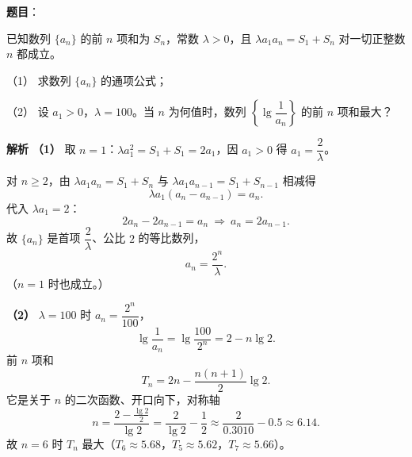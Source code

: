 \begin{answer}

\textbf{题目}：

已知数列 $\{a_n\}$ 的前 $n$ 项和为 $S_n$，常数 $\lambda>0$，且 $\lambda a_1a_n=S_1+S_n$ 对一切正整数 $n$ 都成立。

（1） 求数列 $\{a_n\}$ 的通项公式；

（2） 设 $a_1>0$，$\lambda=100$。当 $n$ 为何值时，数列 $\left\{\lg\dfrac1{a_n}\right\}$ 的前 $n$ 项和最大？

\textbf{解析}
\textbf{（1）} 取 $n=1$：$\lambda a_1^2=S_1+S_1=2a_1$，因 $a_1>0$ 得 $a_1=\dfrac2\lambda$。

对 $n\geqslant2$，由 $\lambda a_1a_n=S_1+S_n$ 与 $\lambda a_1a_{n-1}=S_1+S_{n-1}$ 相减得
\nopagebreak[4]
\[\lambda a_1\left(a_n-a_{n-1}\right)=a_n.\]
代入 $\lambda a_1=2$：
\nopagebreak[4]
\[2a_n-2a_{n-1}=a_n\ \Rightarrow\ a_n=2a_{n-1}.\]
故 $\{a_n\}$ 是首项 $\dfrac2\lambda$、公比 $2$ 的等比数列，
\nopagebreak[4]
\[a_n=\frac{2^n}{\lambda}.\]
（$n=1$ 时也成立。）

\textbf{（2）} $\lambda=100$ 时 $a_n=\dfrac{2^n}{100}$，
\nopagebreak[4]
\[\lg\frac1{a_n}=\lg\frac{100}{2^n}=2-n\lg2.\]
前 $n$ 项和
\nopagebreak[4]
\[T_n=2n-\frac{n(n+1)}2\lg2.\]
它是关于 $n$ 的二次函数、开口向下，对称轴
\nopagebreak[4]
\[n=\frac{2-\frac{\lg2}2}{\lg2}=\frac{2}{\lg2}-\frac12\approx\frac{2}{0.3010}-0.5\approx6.14.\]
故 $n=6$ 时 $T_n$ 最大（$T_6\approx5.68$，$T_5\approx5.62$，$T_7\approx5.66$）。



\end{answer}
